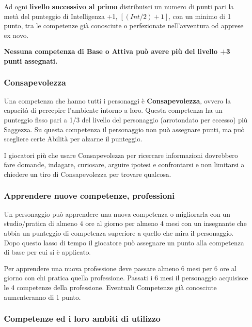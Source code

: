 \begin{multicols}{2}

Ad ogni \textbf{livello successivo al primo} distribuisci un numero di punti pari la metà del punteggio di Intelligenza +1, $[(Int/2)+1]$, con un minimo di 1 punto, tra le competenze già conosciute o perfezionate nell'avventura od apprese ex novo.

\textbf{Nessuna competenza di Base o Attiva può avere più del livello +3 punti assegnati.}

\subsubsection{Consapevolezza}\label{consapevolezza}

Una competenza che hanno tutti i personaggi è \textbf{Consapevolezza}, ovvero la capacità di percepire l'ambiente intorno a loro. Questa competenza ha un punteggio fisso pari a 1/3 del livello del personaggio (arrotondato per eccesso) più Saggezza. Su questa competenza il personaggio non può assegnare punti, ma può scegliere certe Abilità per alzarne il punteggio.

I giocatori più che usare Consapevolezza per ricercare informazioni dovrebbero fare domande, indagare, curiosare, arguire ipotesi e confrontarsi e non limitarsi a chiedere un tiro di Consapevolezza per trovare qualcosa.

\subsubsection{Apprendere nuove competenze, professioni}\label{apprenderenuovecompetenze}

Un personaggio può apprendere una nuova competenza o migliorarla con un studio/pratica di almeno 4 ore al giorno per almeno 4 mesi con un insegnante che abbia un punteggio di competenza superiore a quello che mira il personaggio. Dopo questo lasso di tempo il giocatore può assegnare un punto alla competenza di base per cui si è applicato.

Per apprendere una nuova professione deve passare almeno 6 mesi per 6 ore al giorno con chi pratica quella professione. Passati i 6 mesi il personaggio acquisisce le 4 competenze della professione. Eventuali Competenze già conosciute aumenteranno di 1 punto.

\subsubsection{Competenze ed i loro ambiti di utilizzo}\label{competenzeambitidiutilizzo}


\end{multicols}
